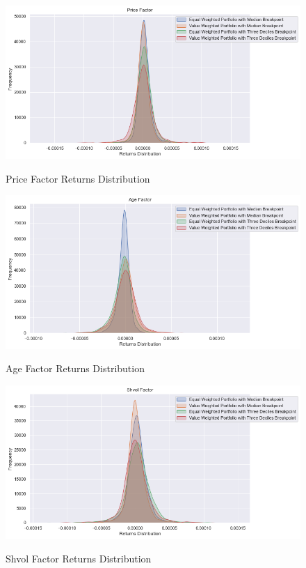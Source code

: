 \begin{figure}[H]
	\caption{Price Factor Returns Distribution}
	\centering
	\includegraphics[scale=.63]{../../output/figures/price.png}
	\label{fig:price}
\end{figure}

\begin{figure}[H]
	\caption{Age Factor Returns Distribution}
	\centering
	\includegraphics[scale=.63]{../../output/figures/age.png}
	\label{fig:age}
\end{figure}

\begin{figure}[H]
	\caption{Shvol Factor Returns Distribution}
	\centering
	\includegraphics[scale=.63]{../../output/figures/shvol.png}
	\label{fig:shvol}
\end{figure}

